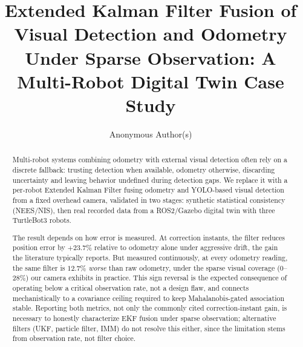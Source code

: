 \documentclass[runningheads]{llncs}
\begin{document}
\title{Extended Kalman Filter Fusion of Visual Detection and Odometry Under Sparse Observation: A Multi-Robot Digital Twin Case Study}


\author{Anonymous Author(s)}



\maketitle

\begin{abstract}
Multi-robot systems combining odometry with external visual detection
often rely on a discrete fallback: trusting detection when available,
odometry otherwise, discarding uncertainty and leaving behavior
undefined during detection gaps. We replace it with a per-robot
Extended Kalman Filter fusing odometry and YOLO-based visual detection
from a fixed overhead camera, validated in two stages: synthetic
statistical consistency (NEES/NIS), then real recorded data from a
ROS2/Gazebo digital twin with three TurtleBot3 robots.

The result depends on how error is measured. At correction instants,
the filter reduces position error by $+23.7\%$ relative to odometry
alone under aggressive drift, the gain the literature typically
reports. But measured continuously, at every odometry reading, the
same filter is $12.7\%$ \emph{worse} than raw odometry, under the
sparse visual coverage (0--28\%) our camera exhibits in practice. This
sign reversal is the expected consequence of operating below a
critical observation rate, not a design flaw, and connects
mechanistically to a covariance ceiling required to keep
Mahalanobis-gated association stable. Reporting both metrics, not only
the commonly cited correction-instant gain, is necessary to honestly
characterize EKF fusion under sparse observation; alternative filters
(UKF, particle filter, IMM) do not resolve this either, since the
limitation stems from observation rate, not filter choice.

\end{abstract}
\end{document}
